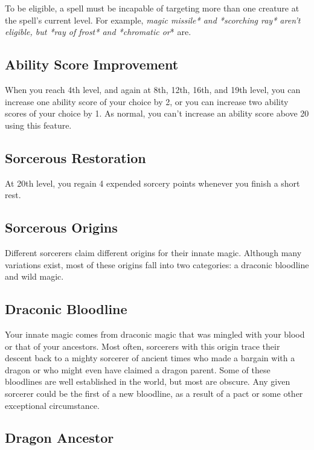 To be eligible, a spell must be incapable of targeting more than one creature at the spell’s current level. For example, \textit{magic missile* and *scorching ray* aren’t eligible, but *ray of frost* and *chromatic or}* are.

\subsection{Ability Score Improvement}

When you reach 4th level, and again at 8th, 12th, 16th, and 19th level, you can increase one ability score of your choice by 2, or you can increase two ability scores of your choice by 1. As normal, you can’t increase an ability score above 20 using this feature.

\subsection{Sorcerous Restoration}

At 20th level, you regain 4 expended sorcery points whenever you finish a short rest.

\subsection{Sorcerous Origins}

Different sorcerers claim different origins for their innate magic. Although many variations exist, most of these origins fall into two categories: a draconic bloodline and wild magic.

\subsection{Draconic Bloodline}

Your innate magic comes from draconic magic that was mingled with your blood or that of your ancestors. Most often, sorcerers with this origin trace their descent back to a mighty sorcerer of ancient times who made a bargain with a dragon or who might even have claimed a dragon parent. Some of these bloodlines are well established in the world, but most are obscure. Any given sorcerer could be the first of a new bloodline, as a result of a pact or some other exceptional circumstance.

\subsection{Dragon Ancestor}


